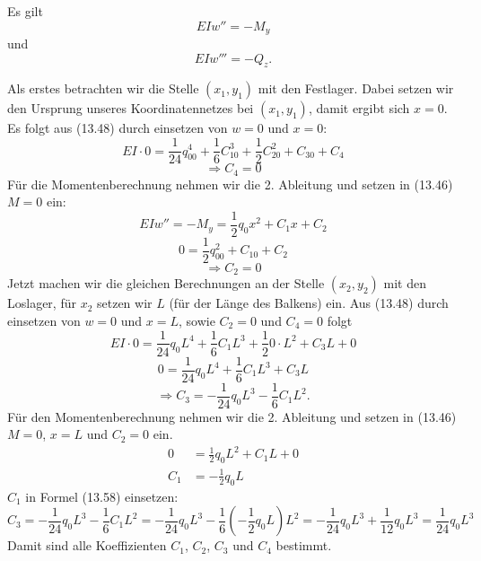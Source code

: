 Es gilt
\begin{equation}
	EIw'' =
	-M_y
\end{equation}
und
\begin{equation}
	EIw'''=
	-Q_z.
\end{equation}

Als erstes betrachten wir die Stelle $(x_1, y_1)$ mit den Festlager.
Dabei setzen wir den Ursprung unseres Koordinatennetzes bei $(x_1, y_1)$, damit ergibt sich $x = 0$. Es folgt aus (13.48) durch einsetzen von $w = 0$ und $x = 0$:
\begin{equation}
	EI\cdot0=
	\frac{1}{24}q_00^4+\frac{1}{6}C_10^3+\frac{1}{2}C_20^2+C_30+C_4
\end{equation}
\begin{equation}
	\Rightarrow C_4=
	0
\end{equation}
Für die Momentenberechnung nehmen wir die 2. Ableitung und setzen in (13.46) $M = 0$ ein:
\begin{equation}
	EIw''=
	-M_y=
	\frac{1}{2}q_0x^2+C_1x+C_2
\end{equation}
\begin{equation}
	0=
	\frac{1}{2}q_00^2+C_10+C_2
\end{equation}
\begin{equation}
	\Rightarrow C_2=
	0
\end{equation}
Jetzt machen wir die gleichen Berechnungen an der Stelle $(x_2, y_2)$ mit den Loslager, für $x_2$ setzen wir $L$ (für der Länge des Balkens) ein. Aus (13.48) durch einsetzen von $w = 0$ und $x = L$, sowie $C_2 = 0$ und $C_4 = 0$ folgt
\begin{equation}
	EI\cdot0=
	\frac{1}{24}q_0L^4+\frac{1}{6}C_1L^3+\frac{1}{2}0\cdot L^2+C_3L+0
\end{equation}
\begin{equation}
	0=
	\frac{1}{24}q_0L^4+\frac{1}{6}C_1L^3+C_3L
\end{equation}
\begin{equation}
	\Rightarrow C_3=
	-\frac{1}{24}q_0L^3-\frac{1}{6}C_1L^2.
\end{equation}
Für den Momentenberechnung nehmen wir die 2. Ableitung und setzen in (13.46) $M = 0$, $x = L$ und $C_2 = 0$ ein.
\begin{align}
		0 &=
		\frac{1}{2}q_0L^2+C_1L+0
    \\
		C_1&=
		-\frac{1}{2}q_0L
\end{align}
$C_1$ in Formel (13.58) einsetzen:
\begin{equation}
	C_3=
	-\frac{1}{24}q_0L^3-\frac{1}{6}C_1L^2
	=	-\frac{1}{24}q_0L^3-\frac{1}{6}\left(-\frac{1}{2}q_0L\right)L^2
	=	-\frac{1}{24}q_0L^3+\frac{1}{12}q_0L^3
	=	\frac{1}{24}q_0L^3
\end{equation}
Damit sind alle Koeffizienten $C_1$, $C_2$, $C_3$ und $C_4$ bestimmt.

